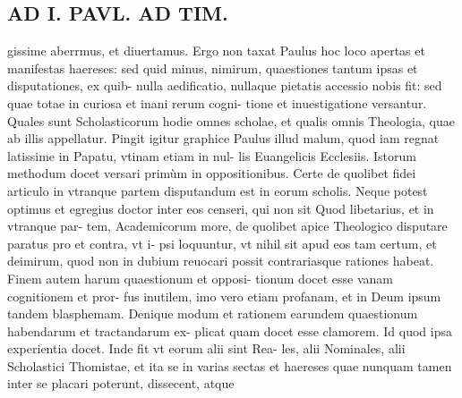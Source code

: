 \documentclass{article}
\begin{document}
\begin{pages}
\section*{AD I. PAVL. AD TIM. }
\marginpar{[ p.P ]}\pstart gissime aberrmus, et diuertamus.  \pend\pstart Ergo non taxat Paulus hoc loco apertas et manifestas haereses: sed quid minus, nimirum, quaestiones tantum ipsas et disputationes, ex quib- nulla aedificatio, nullaque pietatis accessio nobis fit: sed quae totae in curiosa et inani rerum cogni- tione et inuestigatione versantur. Quales sunt Scholasticorum hodie omnes scholae, et qualis omnis Theologia, quae ab illis appellatur. Pingit igitur graphice Paulus illud malum, quod iam regnat latissime in Papatu, vtinam etiam in nul- lis Euangelicis Ecclesiis. Istorum methodum docet versari primùm in oppositionibus. Certe de quolibet fidei articulo in vtranque partem disputandum est in eorum scholis. Neque potest optimus et egregius doctor inter eos censeri, qui non sit Quod libetarius, et in vtranque par- tem, Academicorum more, de quolibet apice Theologico disputare paratus pro et contra, vt i- psi loquuntur, vt nihil sit apud eos tam certum, et deimirum, quod non in dubium reuocari possit contrariasque rationes habeat.  \pend\pstart Finem autem harum quaestionum et opposi- tionum docet esse vanam cognitionem et pror- fus inutilem, imo vero etiam profanam, et in Deum ipsum tandem blasphemam.  \pend\pstart Denique modum et rationem earundem quaestionum habendarum et tractandarum ex- plicat quam docet esse clamorem. Id quod ipsa experientia docet. Inde fit vt eorum alii sint Rea- les, alii Nominales, alii Scholastici Thomistae, et ita se in varias sectas et haereses quae nunquam tamen inter se placari poterunt, dissecent, atque  \pend

\end{pages}
\end{document}
